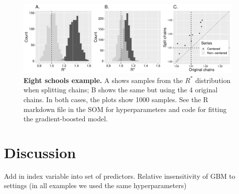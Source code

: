 \documentclass{article}
\begin{document}
\begin{figure}[h]
	\centerline{\includegraphics[width=1.0\textwidth]{../output/eight_schools.pdf}}
	\caption{\textbf{Eight schools example.} A shows samples from the $R^*$ distribution when splitting chains; B shows the same but using the 4 original chains. In both cases, the plots show 1000 samples. See the R markdown file in the SOM for hyperparameters and code for fitting the gradient-boosted model.}
	\label{fig:eight_schools}
\end{figure}

\section{Discussion}
Add in index variable into set of predictors.
Relative insensitivity of GBM to settings (in all examples we used the same hyperparameters)



	

 
	
\end{document}
